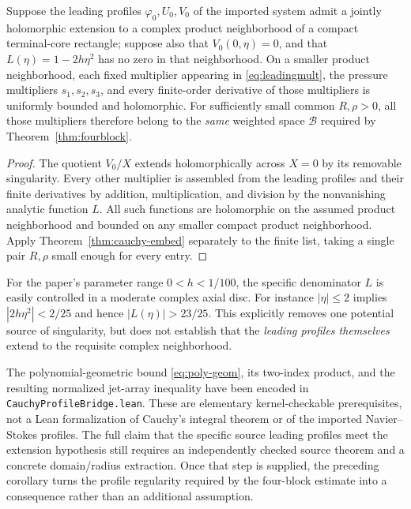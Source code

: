 \begin{corollary}
\label{cor:source-to-norm}
Suppose the leading profiles $\varphi_0,U_0,V_0$ of the imported system admit a jointly holomorphic extension to a complex product neighborhood of a compact terminal-core rectangle; suppose also that $V_0(0,\eta)=0$, and that $L(\eta)=1-2h\eta^2$ has no zero in that neighborhood. On a smaller product neighborhood, each fixed multiplier appearing in \eqref{eq:leadingmult}, the pressure multipliers $s_1,s_2,s_3$, and every finite-order derivative of those multipliers is uniformly bounded and holomorphic. For sufficiently small common $R,\rho>0$, all those multipliers therefore belong to the \emph{same} weighted space $\mathcal B$ required by Theorem~\ref{thm:fourblock}.
\end{corollary}
\begin{proof}
The quotient $V_0/X$ extends holomorphically across $X=0$ by its removable singularity. Every other multiplier is assembled from the leading profiles and their finite derivatives by addition, multiplication, and division by the nonvanishing analytic function $L$. All such functions are holomorphic on the assumed product neighborhood and bounded on any smaller compact product neighborhood. Apply Theorem~\ref{thm:cauchy-embed} separately to the finite list, taking a single pair $R,\rho$ small enough for every entry.
\end{proof}

For the paper's parameter range $0<h<1/100$, the specific denominator $L$ is easily controlled in a moderate complex axial disc. For instance $|\eta|\le2$ implies $|2h\eta^2|<2/25$ and hence $|L(\eta)|>23/25$. This explicitly removes one potential source of singularity, but does not establish that the \emph{leading profiles themselves} extend to the requisite complex neighborhood.

The polynomial-geometric bound \eqref{eq:poly-geom}, its two-index product, and the resulting normalized jet-array inequality have been encoded in \texttt{CauchyProfileBridge.lean}. These are elementary kernel-checkable prerequisites, not a Lean formalization of Cauchy's integral theorem or of the imported Navier--Stokes profiles. The full claim that the specific source leading profiles meet the extension hypothesis still requires an independently checked source theorem and a concrete domain/radius extraction. Once that step is supplied, the preceding corollary turns the profile regularity required by the four-block estimate into a consequence rather than an additional assumption.
